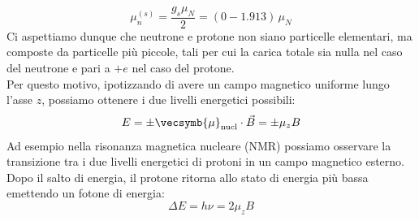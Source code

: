 \begin{equation}
 \mu_{n}^{(s)} = \dfrac{g_s \mu_N}{2} = (0-1.913) \,\mu_N
\end{equation}
Ci aspettiamo dunque che neutrone e protone non siano particelle elementari, ma composte da particelle più piccole, tali per cui la carica totale sia nulla nel caso del neutrone e pari a $+e$ nel caso del protone.\\
Per questo motivo, ipotizzando di avere un campo magnetico uniforme lungo l'asse $z$, possiamo ottenere i due livelli energetici possibili:
\begin{equation}
 E = \pm \vecsymb{\mu}_{\text{nucl}} \cdot \vec{B} = \pm \mu_{z} B
\end{equation}
Ad esempio nella risonanza magnetica nucleare (NMR) possiamo osservare la transizione tra i due livelli energetici di protoni in un campo magnetico esterno. Dopo il salto di energia, il protone ritorna allo stato di energia più bassa emettendo un fotone di energia:
\begin{equation}
 \Delta E = h \nu = 2 \mu_{z} B
\end{equation}
